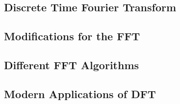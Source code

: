 \subsection{Discrete Time Fourier Transform}
\subsection{Modifications for the FFT}
\subsection{Different FFT Algorithms}
\subsection{Modern Applications of DFT}
